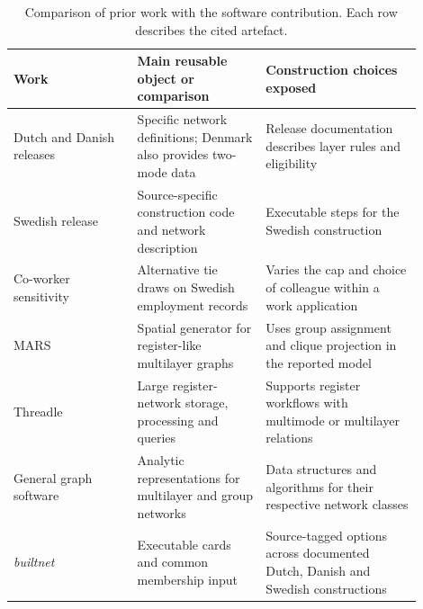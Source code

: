 \begin{table}[!htbp]
\centering\small
\caption{Comparison of prior work with the software contribution. Each row describes the cited artefact.}
\label{tab:prior}
\begin{tabular}{@{} >{\raggedright\arraybackslash}p{0.27\linewidth} >{\raggedright\arraybackslash}p{0.29\linewidth} >{\raggedright\arraybackslash}p{0.34\linewidth} @{}}
\toprule
\rowcolor{tableblue} \textbf{Work} & \textbf{Main reusable object or comparison} & \textbf{Construction choices exposed} \\
\midrule
Dutch and Danish releases \citep{vanderlaan2023,cbs2023,cremers2025} & Specific network definitions; Denmark also provides two-mode data & Release documentation describes layer rules and eligibility \\
Swedish release \citep{panayiotou2025,secode2026} & Source-specific construction code and network description & Executable steps for the Swedish construction \\
Co-worker sensitivity \citep{lengyel2017} & Alternative tie draws on Swedish employment records & Varies the cap and choice of colleague within a work application \\
MARS \citep{hamilton2026} & Spatial generator for register-like multilayer graphs & Uses group assignment and clique projection in the reported model \\
Threadle \citep{nordlundthreadle2026,nordlund2026} & Large register-network storage, processing and queries & Supports register workflows with multimode or multilayer relations \\
General graph software \citep{nurmi2024,landry2023,lotito2023} & Analytic representations for multilayer and group networks & Data structures and algorithms for their respective network classes \\
\textit{builtnet} \citep{builtnet2026} & Executable cards and common membership input & Source-tagged options across documented Dutch, Danish and Swedish constructions \\
\bottomrule
\end{tabular}
\end{table}
